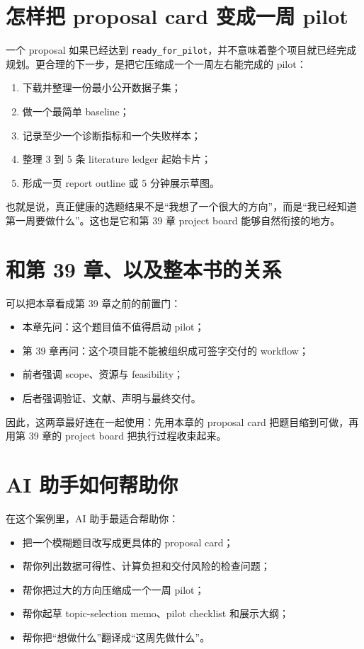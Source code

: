 \section{怎样把 proposal card 变成一周 pilot}

一个 proposal 如果已经达到 \texttt{ready\_for\_pilot}，并不意味着整个项目就已经完成规划。更合理的下一步，是把它压缩成一个一周左右能完成的 pilot：

\begin{enumerate}
    \item 下载并整理一份最小公开数据子集；
    \item 做一个最简单 baseline；
    \item 记录至少一个诊断指标和一个失败样本；
    \item 整理 3 到 5 条 literature ledger 起始卡片；
    \item 形成一页 report outline 或 5 分钟展示草图。
\end{enumerate}

也就是说，真正健康的选题结果不是“我想了一个很大的方向”，而是“我已经知道第一周要做什么”。这也是它和第 39 章 project board 能够自然衔接的地方。

\section{和第 39 章、以及整本书的关系}

可以把本章看成第 39 章之前的前置门：

\begin{itemize}
    \item 本章先问：这个题目值不值得启动 pilot；
    \item 第 39 章再问：这个项目能不能被组织成可签字交付的 workflow；
    \item 前者强调 scope、资源与 feasibility；
    \item 后者强调验证、文献、声明与最终交付。
\end{itemize}

因此，这两章最好连在一起使用：先用本章的 proposal card 把题目缩到可做，再用第 39 章的 project board 把执行过程收束起来。

\section{AI 助手如何帮助你}

在这个案例里，AI 助手最适合帮助你：

\begin{itemize}
    \item 把一个模糊题目改写成更具体的 proposal card；
    \item 帮你列出数据可得性、计算负担和交付风险的检查问题；
    \item 帮你把过大的方向压缩成一个一周 pilot；
    \item 帮你起草 topic-selection memo、pilot checklist 和展示大纲；
    \item 帮你把“想做什么”翻译成“这周先做什么”。
\end{itemize}


